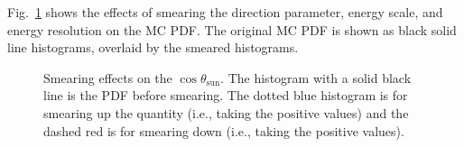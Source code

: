 {Fig.~\ref{smearESpdfs} shows the effects of smearing the direction parameter, energy scale, and energy resolution on the MC PDF. The original MC PDF is shown as black solid line histograms, overlaid by the smeared histograms.

\begin{figure}[htbp]
	\centering
	\caption[Smearing effects on the $\cos\theta_\mathrm{sun}$ PDF.]{Smearing effects on the $\cos\theta_\mathrm{sun}$. The histogram with a solid black line is the PDF before smearing. The dotted blue histogram is for smearing up the quantity (i.e., taking the positive values) and the dashed red is for smearing down (i.e., taking the positive values).\label{smearESpdfs}}
\end{figure}

}
